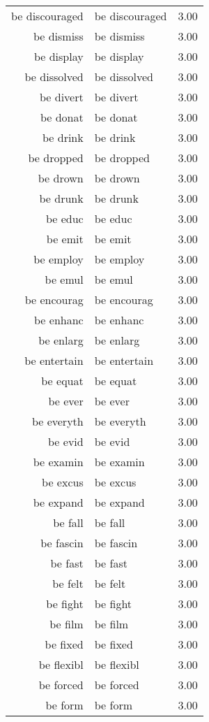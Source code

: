 \begin{table}[ht]
\begin{tabular}{rlr}
  be discouraged & be discouraged & 3.00 \\ 
  be dismiss & be dismiss & 3.00 \\ 
  be display & be display & 3.00 \\ 
  be dissolved & be dissolved & 3.00 \\ 
  be divert & be divert & 3.00 \\ 
  be donat & be donat & 3.00 \\ 
  be drink & be drink & 3.00 \\ 
  be dropped & be dropped & 3.00 \\ 
  be drown & be drown & 3.00 \\ 
  be drunk & be drunk & 3.00 \\ 
  be educ & be educ & 3.00 \\ 
  be emit & be emit & 3.00 \\ 
  be employ & be employ & 3.00 \\ 
  be emul & be emul & 3.00 \\ 
  be encourag & be encourag & 3.00 \\ 
  be enhanc & be enhanc & 3.00 \\ 
  be enlarg & be enlarg & 3.00 \\ 
  be entertain & be entertain & 3.00 \\ 
  be equat & be equat & 3.00 \\ 
  be ever & be ever & 3.00 \\ 
  be everyth & be everyth & 3.00 \\ 
  be evid & be evid & 3.00 \\ 
  be examin & be examin & 3.00 \\ 
  be excus & be excus & 3.00 \\ 
  be expand & be expand & 3.00 \\ 
  be fall & be fall & 3.00 \\ 
  be fascin & be fascin & 3.00 \\ 
  be fast & be fast & 3.00 \\ 
  be felt & be felt & 3.00 \\ 
  be fight & be fight & 3.00 \\ 
  be film & be film & 3.00 \\ 
  be fixed & be fixed & 3.00 \\ 
  be flexibl & be flexibl & 3.00 \\ 
  be forced & be forced & 3.00 \\ 
  be form & be form & 3.00 \\ 

\end{tabular}
\end{table}
